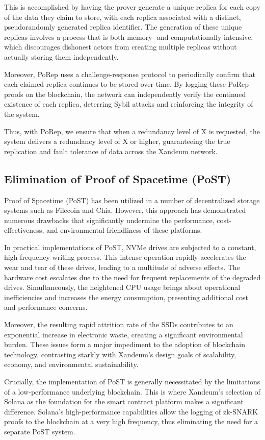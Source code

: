 \documentclass[11 pt]{article}   	%
\begin{document}
This is accomplished by having the prover generate a unique replica for each copy of the data they claim to store, with each replica associated with a distinct, pseudorandomly generated replica identifier. The generation of these unique replicas involves a process that is both memory- and computationally-intensive, which discourages dishonest actors from creating multiple replicas without actually storing them independently.

Moreover, PoRep uses a challenge-response protocol to periodically confirm that each claimed replica continues to be stored over time. By logging these PoRep proofs on the blockchain, the network can independently verify the continued existence of each replica, deterring Sybil attacks and reinforcing the integrity of the system.

Thus, with PoRep, we ensure that when a redundancy level of X is requested, the system delivers a redundancy level of X or higher, guaranteeing the true replication and fault tolerance of data across the Xandeum network.

\subsection{Elimination of Proof of Spacetime (PoST)}
Proof of Spacetime (PoST) has been utilized in a number of decentralized storage systems such as Filecoin and Chia. However, this approach has demonstrated numerous drawbacks that significantly undermine the performance, cost-effectiveness, and environmental friendliness of these platforms.

In practical implementations of PoST, NVMe drives are subjected to a constant, high-frequency writing process. This intense operation rapidly accelerates the wear and tear of these drives, leading to a multitude of adverse effects. The hardware cost escalates due to the need for frequent replacements of the degraded drives. Simultaneously, the heightened CPU usage brings about operational inefficiencies and increases the energy consumption, presenting additional cost and performance concerns.

Moreover, the resulting rapid attrition rate of the SSDs contributes to an exponential increase in electronic waste, creating a significant environmental burden. These issues form a major impediment to the adoption of blockchain technology, contrasting starkly with Xandeum's design goals of scalability, economy, and environmental sustainability.

Crucially, the implementation of PoST is generally necessitated by the limitations of a low-performance underlying blockchain. This is where Xandeum's selection of Solana as the foundation for the smart contract platform makes a significant difference. Solana's high-performance capabilities allow the logging of zk-SNARK proofs to the blockchain at a very high frequency, thus eliminating the need for a separate PoST system.
\end{document}
